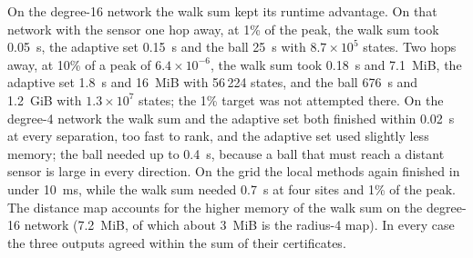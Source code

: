 \documentclass[aps,pra,superscriptaddress,floatfix,longbibliography,twocolumn]{revtex4-2}
\begin{document}
On the degree-16 network the walk sum kept its runtime advantage. On that network with the sensor one hop away, at 1\% of the peak, the walk sum took 0.05~s, the adaptive set 0.15~s and the ball 25~s with $8.7\times10^5$ states. Two hops away, at 10\% of a peak of $6.4\times10^{-6}$, the walk sum took 0.18~s and 7.1~MiB, the adaptive set 1.8~s and 16~MiB with 56\,224 states, and the ball 676~s and 1.2~GiB with $1.3\times10^7$ states; the 1\% target was not attempted there. On the degree-4 network the walk sum and the adaptive set both finished within 0.02~s at every separation, too fast to rank, and the adaptive set used slightly less memory; the ball needed up to 0.4~s, because a ball that must reach a distant sensor is large in every direction. On the grid the local methods again finished in under 10~ms, while the walk sum needed 0.7~s at four sites and 1\% of the peak. The distance map accounts for the higher memory of the walk sum on the degree-16 network (7.2~MiB, of which about 3~MiB is the radius-4 map). In every case the three outputs agreed within the sum of their certificates.
\end{document}
